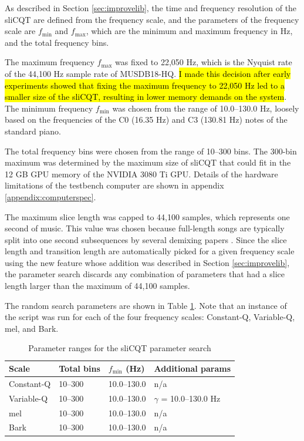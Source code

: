 \documentclass[report.tex]{subfiles}
\begin{document}
As described in Section \ref{sec:improvelib}, the time and frequency resolution of the sliCQT are defined from the frequency scale, and the parameters of the frequency scale are $f_{\text{min}}$ and $f_{\text{max}}$, which are the minimum and maximum frequency in Hz, and the total frequency bins.

The maximum frequency $f_{\text{max}}$ was fixed to 22,050 Hz, which is the Nyquist rate of the 44,100 Hz sample rate of MUSDB18-HQ. \hl{I made this decision after early experiments showed that fixing the maximum frequency to 22,050 Hz led to a smaller size of the sliCQT, resulting in lower memory demands on the system}. The minimum frequency $f_{\text{min}}$ was chosen from the range of 10.0--130.0 Hz, loosely based on the frequencies of the C0 (16.35 Hz) and C3 (130.81 Hz) notes of the standard piano.

The total frequency bins were chosen from the range of 10--300 bins. The 300-bin maximum was determined by the maximum size of sliCQT that could fit in the 12 GB GPU memory of the NVIDIA 3080 Ti GPU. Details of the hardware limitations of the testbench computer are shown in appendix \ref{appendix:computerspec}.

The maximum slice length was capped to 44,100 samples, which represents one second of music. This value was chosen because full-length songs are typically split into one second subsequences by several demixing papers \parencite{plumbley1, plumbley2, demucs}. Since the slice length and transition length are automatically picked for a given frequency scale using the new feature whose addition was described in Section \ref{sec:improvelib}, the parameter search discards any combination of parameters that had a slice length larger than the maximum of 44,100 samples.

The random search parameters are shown in Table \ref{table:slicqparams}. Note that an instance of the script was run for each of the four frequency scales: Constant-Q, Variable-Q, mel, and Bark.

\begin{table}[ht]
	\centering
	\caption{Parameter ranges for the sliCQT parameter search}
	\label{table:slicqparams}
\begin{tabular}{ |l|l|l|l| }
	 \hline
	 Scale & Total bins & $f_{\text{min}}$ (Hz) & Additional params \\
	 \hline
	 \hline
	 Constant-Q & 10--300 & 10.0--130.0 & n/a \\
	 \hline
	 Variable-Q & 10--300 & 10.0--130.0 & $\gamma$ = 10.0--130.0 Hz \\
	 \hline
	 mel & 10--300 & 10.0--130.0 & n/a \\
	 \hline
	 Bark & 10--300 & 10.0--130.0 & n/a \\
	 \hline
\end{tabular}
\end{table}
\end{document}
